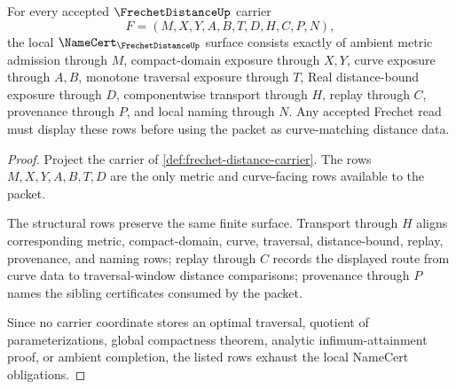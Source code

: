 \begin{theorem}
\label{thm:frechet-distance-namecert-obligations}
For every accepted $\FrechetDistanceUp$ carrier
$$
F=(M,X,Y,A,B,T,D,H,C,P,N),
$$
the local $\NameCert_{\FrechetDistanceUp}$ surface consists exactly of ambient metric admission through $M$, compact-domain exposure through $X,Y$, curve exposure through $A,B$, monotone traversal exposure through $T$, Real distance-bound exposure through $D$, componentwise transport through $H$, replay through $C$, provenance through $P$, and local naming through $N$. Any accepted Frechet read must display these rows before using the packet as curve-matching distance data.
\end{theorem}
\begin{proof}
Project the carrier of \autoref{def:frechet-distance-carrier}. The rows $M,X,Y,A,B,T,D$ are the only metric and curve-facing rows available to the packet.

The structural rows preserve the same finite surface. Transport through $H$ aligns corresponding metric, compact-domain, curve, traversal, distance-bound, replay, provenance, and naming rows; replay through $C$ records the displayed route from curve data to traversal-window distance comparisons; provenance through $P$ names the sibling certificates consumed by the packet.

Since no carrier coordinate stores an optimal traversal, quotient of parameterizations, global compactness theorem, analytic infimum-attainment proof, or ambient completion, the listed rows exhaust the local NameCert obligations.
\end{proof}

